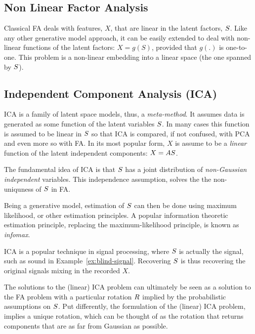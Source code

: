\documentclass[12pt,a4paper]{article}
\begin{document}
\subsection{Non Linear Factor Analysis}
Classical FA deals with features, $X$, that are linear in the latent factors, $S$. 
Like any other generative model approach, it can be easily extended to deal with non-linear functions of the latent factors: $X=g(S)$, provided that $g(.)$ is one-to-one. 
This problem is a non-linear embedding into a linear space (the one spanned by $S$).





\subsection{Independent Component Analysis (ICA)}
\label{sec:ica}


ICA is a family of latent space models, thus, a \emph{meta-method}.
It assumes data is generated as some function of the latent variables $S$. 
In many cases this function is assumed to be linear in $S$ so that ICA is compared, if not confused, with PCA and even more so with FA. 
In its most popular form, $X$ is assume to be a \emph{linear} function of the latent independent components: $X=A S$.

The fundamental idea of ICA is that $S$ has a joint distribution of \emph{non-Gaussian independent} variables. 
This independence assumption, solves the the non-uniquness of $S$ in FA.

Being a generative model, estimation of $S$ can then be done using maximum likelihood, or other estimation principles. 
A popular information theoretic estimation principle, replacing the maximum-likelihood principle, is known as \emph{infomax}.

ICA is a popular technique in signal processing, where $S$ is actually the signal, such as sound in Example~\ref{ex:blind-signal}.
Recovering $S$ is thus recovering the original signals mixing in the recorded $X$. 



\begin{remark}
	The solutions to the (linear) ICA problem can ultimately be seen as a solution to the FA problem with a particular rotation $R$ implied by the probabilistic assumptions on $S$.
	Put differently, the formulation of the (linear) ICA problem, implies a unique rotation, which can be thought of as the rotation that returns components that are as far from Gaussian as possible. 
\end{remark}
\end{document}
